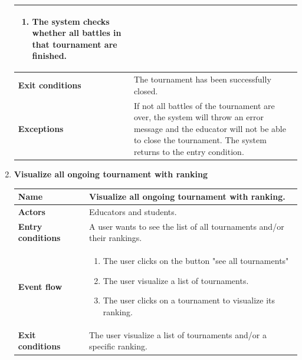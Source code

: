 \begin{enumerate}[label=\textbf{UC.\arabic*}]
\begin{table}[H]
\begin{tabular}{|m{3.2cm}|m{9.8cm}|}
\begin{enumerate}[label=\arabic*.]
                        \item The system checks whether all battles in that tournament are finished.
                    \end{enumerate}\\
                    \hline
                    \textbf{Exit conditions}  & The tournament has been successfully closed. \\
                    \hline
                    \textbf{Exceptions}  & If not all battles of the tournament are over, the system will throw an error message and the educator will not be able to close the tournament. The system returns to the entry condition.\\
                    \hline 
                \end{tabular}
        \end{table}
        \item {} \textbf{Visualize all ongoing tournament with ranking}
        \begin{table}[H]
    	    \centering
                \renewcommand{\arraystretch}{1.5}
                \begin{tabular}{|m{3.2cm}|m{9.8cm}|}
                    \hline
                    \textbf{Name} & Visualize all ongoing tournament with ranking.  \\
                    \hline
                    \textbf{Actors} & Educators and students. \\
                    \hline
                    \textbf{Entry conditions}  & A user wants to see the list of all tournaments and/or their rankings. \\
                    \hline
                    \textbf{Event flow}  & 
                    \begin{enumerate}[label=\arabic*.]
                        \item The user clicks on the button "see all tournaments"
                        \item The user visualize a list of tournaments.
                        \item The user clicks on a tournament to visualize its ranking.
                    \end{enumerate}\\
                    \hline
                    \textbf{Exit conditions}  & The user visualize a list of tournaments and/or a specific ranking. \\
                    \hline
                \end{tabular}

\end{table}
\end{enumerate}
